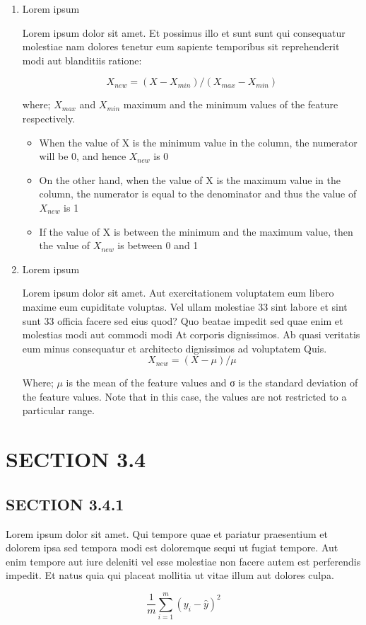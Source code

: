 \documentclass[a4paper,12pt]{report}
\begin{document}
\begin{enumerate}
    \item Lorem ipsum
   \par Lorem ipsum dolor sit amet. Et possimus illo et sunt sunt qui consequatur molestiae nam dolores tenetur eum sapiente temporibus sit reprehenderit modi aut blanditiis ratione:

\begin{equation}
X_{new} = (X - X_{min}) / (X_{max} - X_{min})
\end{equation}

where; $X_{max}$ and $X_{min}$ maximum and the minimum values of the feature respectively.
\begin{itemize}
    \item When the value of X is the minimum value in the column, the numerator will be 0, and hence $X_{new}$ is 0
\item On the other hand, when the value of X is the maximum value in the column, the numerator is equal to the denominator and thus the value of $X_{new}$ is 1
\item If the value of X is between the minimum and the maximum value, then the value of $X_{new}$ is between 0 and 1

\end{itemize}
   
    \item Lorem ipsum
    \par Lorem ipsum dolor sit amet. Aut exercitationem voluptatem eum libero maxime eum cupiditate voluptas. Vel ullam molestiae 33 sint labore et sint sunt 33 officia facere sed eius quod? Quo beatae impedit sed quae enim et molestias modi aut commodi modi At corporis dignissimos. Ab quasi veritatis eum minus consequatur et architecto dignissimos ad voluptatem Quis. 
\begin{equation}
X_{new} = (X - \mu)/ \mu
\end{equation}
\par Where; $\mu$ is the mean of the feature values and σ is the standard deviation of the feature values. Note that in this case, the values are not restricted to a particular range.
\end{enumerate}

\section{SECTION 3.4}

\subsection{SECTION 3.4.1}
\hspace{.5cm}
 Lorem ipsum dolor sit amet. Qui tempore quae et pariatur praesentium et dolorem ipsa sed tempora modi est doloremque sequi ut fugiat tempore. Aut enim tempore aut iure deleniti vel esse molestiae non facere autem est perferendis impedit. Et natus quia qui placeat mollitia ut vitae illum aut dolores culpa. \par
\begin{equation}
\frac{1}{m} \sum_{i=1}^{m}(y_i-\hat{y})^2
\end{equation}
\end{document}
